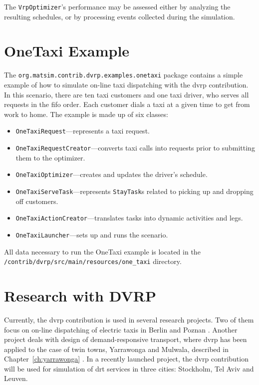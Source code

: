 The \lstinline$VrpOptimizer$'s performance may be assessed either by analyzing the resulting schedules, or by processing events collected during the simulation.

\section{OneTaxi Example}
The \lstinline$org.matsim.contrib.dvrp.examples.onetaxi$ package contains a simple example of how to simulate on-line taxi dispatching with the \gls{dvrp} contribution. In this scenario, there are ten taxi customers and one taxi driver, who serves all requests in the \gls{fifo} order. Each customer dials a taxi at a given time to get from work to home. The example is made up of six classes:
%
\begin{itemize}\styleItemize
	\item \lstinline$OneTaxiRequest$---represents a taxi request.	
	\item \lstinline$OneTaxiRequestCreator$---converts taxi calls into requests prior to submitting them to the optimizer.
	\item \lstinline$OneTaxiOptimizer$---creates and updates the driver's schedule.
	\item \lstinline$OneTaxiServeTask$---represents \lstinline$StayTask$s related to picking up and dropping off customers.
	\item \lstinline$OneTaxiActionCreator$---translates tasks into dynamic activities and legs.
	\item \lstinline$OneTaxiLauncher$---sets up and runs the scenario.
\end{itemize}
%
All data necessary to run the OneTaxi example is located in the \lstinline$/contrib/dvrp/src/main/resources/one_taxi$ directory.

\section{Research with DVRP}
Currently, the \gls{dvrp} contribution is used in several research projects. Two of them focus on on-line dispatching of electric taxis in Berlin and Poznan \citep{MaciejewskiNagelOnlineTaxis2, MaciejewskiNagel2013OnlineTaxisVSPWP, MaciejewskiNagel2013CooperationPPAM, Maciejewski2014OnlineViaOffline}. Another project deals with design of demand-responsive transport, where \gls{dvrp} has been applied to the case of twin towns, Yarrawonga and Mulwala, described in Chapter~\ref{ch:yarrawonga} \citep{RonThoWin2015, ronald14SimulatingDRT}. In a recently launched project, the \gls{dvrp} contribution will be used for simulation of \gls{drt} services in three cities: Stockholm, Tel Aviv and Leuven.

